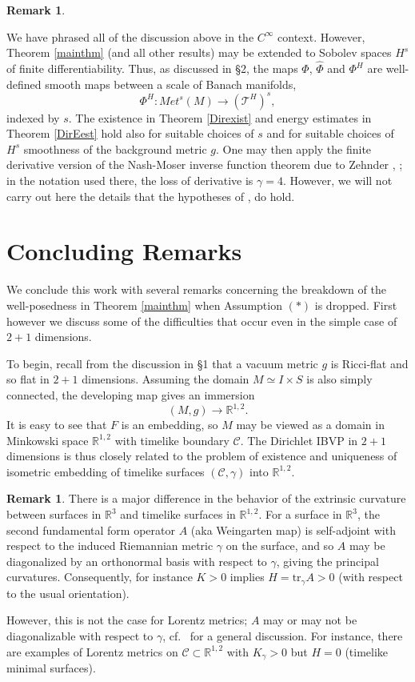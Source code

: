 \documentclass[10pt]{amsart}
\newcommand{\g}{\gamma}
\newcommand{\cC}{{\mathcal C}}
\newcommand{\cT}{{\mathcal T}}
\newcommand{\bR}{\mathbb R}
\newcommand{\be}{\begin{equation}}
\newcommand{\ee}{\end{equation}}
\newcommand{\tr}{\mathrm{tr}}
\renewcommand{\to}{\rightarrow}
\renewcommand{\hat}{\widehat}
\newcommand{\<}{\langle}
\renewcommand{\>}{\rangle}
\theoremstyle{plain}
\theoremstyle{remark}
\theoremstyle{definition}
\newtheorem{remark}[lemma]{Remark}
\numberwithin{equation}{section}
\begin{document}
\begin{remark} \label{findiff} 
{\rm We have phrased all of the discussion above in the $C^{\infty}$ context. However, Theorem \ref{mainthm} (and all other results) may be extended 
to Sobolev spaces $H^s$ of finite differentiability. Thus, as discussed in \S 2, the maps $\Phi$, $\hat \Phi$ and $\Phi^H$ are well-defined smooth maps 
between a scale of Banach manifolds, 
$$\Phi^H: Met^s(M) \to (\cT^H)^s,$$
indexed by $s$. The existence in Theorem \ref{Direxist} and energy estimates in Theorem \ref{DirEest} hold also for suitable choices of $s$ and 
for suitable choices of $H^s$ smoothness of the background metric $g$. One may then apply the finite derivative version of the Nash-Moser inverse 
function theorem due to Zehnder \cite{Z1}, \cite[Theorem 6.3.3]{Z2};  in the notation used there, the loss of derivative is $\g = 4$. 
However, we will not carry out here the details that the hypotheses of \cite[Theorem 6.3.3]{Z2}, do hold. 

}
\end{remark}
 
 
   
   
 \section{Concluding Remarks}

  We conclude this work with several remarks concerning the breakdown of the well-posedness in Theorem \ref{mainthm} when Assumption $(*)$ is 
 dropped. First however we discuss some of the difficulties that occur even in the simple case of $2+1$ dimensions. 
 
   To begin, recall from the discussion in \S 1 that a vacuum metric $g$ is Ricci-flat and so flat in $2+1$ dimensions. Assuming the domain $M \simeq I\times S$ 
is also simply connected, the developing map gives an immersion 
\be \label{emb}
(M, g) \to \bR^{1,2}.
\ee
It is easy to see that $F$ is an embedding, so $M$ may be viewed as a domain in Minkowski space $\bR^{1,2}$ with timelike boundary $\cC$. The Dirichlet 
IBVP in $2+1$ dimensions is thus closely related to the problem of existence and uniqueness of isometric embedding of timelike surfaces $(\cC, \g)$ into 
$\bR^{1,2}$. 

\begin{remark}
{\rm 
There is a major difference in the behavior of the extrinsic curvature between surfaces in $\bR^3$ and timelike surfaces in $\bR^{1,2}$. For a surface in $\bR^3$, 
the second fundamental form operator $A$ (aka Weingarten map) is self-adjoint with respect to the induced Riemannian metric $\g$ on the surface, and so 
$A$ may be diagonalized by an orthonormal basis with respect to $\g$, giving the principal curvatures.  Consequently, for instance $K > 0$ implies 
$H = \tr_{\g}A > 0$ (with respect to the usual orientation). 

  However, this is not the case for Lorentz metrics; $A$ may or may not be diagonalizable with respect to $\g$, cf.~\cite{Lop} 
for a general discussion. For instance, there are examples of Lorentz metrics on $\cC \subset \bR^{1,2}$ with $K_{\g} > 0$ but $H = 0$ 
(timelike minimal surfaces). 
}
\end{remark}
\end{document}
